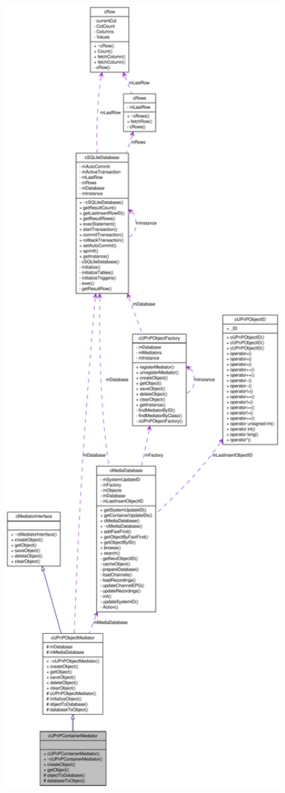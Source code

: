\begin{figure}[H]
\begin{center}
\leavevmode
\includegraphics[width=400pt]{classcUPnPContainerMediator__coll__graph}
\end{center}
\end{figure}
